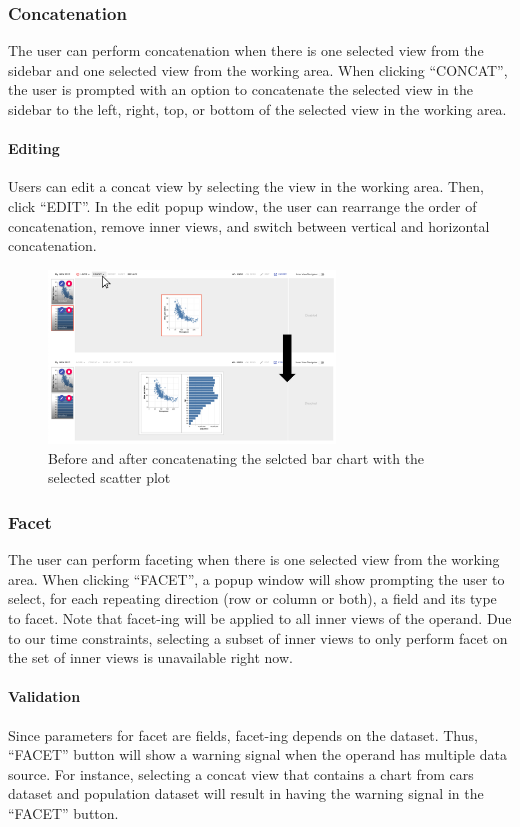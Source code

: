 \documentclass[journal]{vgtc}                %
\begin{document}
\subsubsection{Concatenation}
The user can perform concatenation when there is one selected view from the sidebar
and one selected view from the working area. When clicking “CONCAT”, the user is
prompted with an option to concatenate the selected view in the sidebar to the
left, right, top, or bottom of the selected view in the working area.

\paragraph{Editing} Users can edit a concat view by selecting the view in the
working area. Then, click “EDIT”. In the edit popup window, the user can rearrange
the order of concatenation, remove inner views, and switch between vertical and
horizontal concatenation.

\begin{figure}[htb]
 \centering
 \includegraphics[width=3in]{concat.png}
 \caption{Before and after concatenating the selcted bar chart with the selected scatter plot}
\end{figure}

\subsubsection{Facet}
The user can perform faceting when there is one selected view from the working
area. When clicking “FACET”, a popup window will show prompting the user to select,
for each repeating direction (row or column or both), a field and its type to facet.
Note that facet-ing will be applied to all inner views of the operand. Due to our time
constraints, selecting a subset of inner views to only perform facet on the set of
inner views is unavailable right now.

\paragraph{Validation} Since parameters for facet are fields, facet-ing
depends on the dataset. Thus, “FACET” button will show a warning signal when the
operand has multiple data source. For instance, selecting a concat view that
contains a chart from cars dataset and population dataset will result in having
the warning signal in the “FACET”  button.
\end{document}
